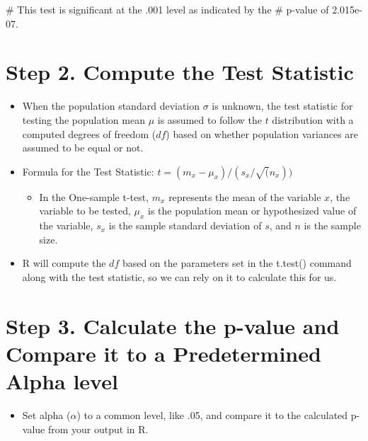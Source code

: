 \documentclass[
  letterpaper,
  DIV=11,
  numbers=noendperiod]{scrreprt}
\newenvironment{Shaded}{\begin{snugshade}}{\end{snugshade}}
\newcommand{\CommentTok}[1]{\textcolor[rgb]{0.37,0.37,0.37}{#1}}
\providecommand{\tightlist}{%
  \setlength{\itemsep}{0pt}\setlength{\parskip}{0pt}}\usepackage{longtable,booktabs,array}
\begin{document}
\begin{Shaded}
\begin{Highlighting}[]
\CommentTok{\# This test is significant at the .001 level as indicated by the}
\CommentTok{\# p{-}value of 2.015e{-}07.}
\end{Highlighting}
\end{Shaded}

\section{Step 2. Compute the Test
Statistic}\label{step-2.-compute-the-test-statistic}

\begin{itemize}
\tightlist
\item
  When the population standard deviation \(\sigma\) is unknown, the test
  statistic for testing the population mean \(\mu\) is assumed to follow
  the \(t\) distribution with a computed degrees of freedom (\(df\))
  based on whether population variances are assumed to be equal or not.
\item
  Formula for the Test Statistic: \(t = (m_x-\mu_x)/(s_x/\sqrt(n_x))\)

  \begin{itemize}
  \tightlist
  \item
    In the One-sample t-test, \(m_x\) represents the mean of the
    variable \(x\), the variable to be tested, \(\mu_x\) is the
    population mean or hypothesized value of the variable, \(s_x\) is
    the sample standard deviation of \(s\), and \(n\) is the sample
    size.
  \end{itemize}
\item
  R will compute the \(df\) based on the parameters set in the t.test()
  command along with the test statistic, so we can rely on it to
  calculate this for us.
\end{itemize}

\section{Step 3. Calculate the p-value and Compare it to a Predetermined
Alpha
level}\label{step-3.-calculate-the-p-value-and-compare-it-to-a-predetermined-alpha-level}

\begin{itemize}
\tightlist
\item
  Set alpha (\(\alpha\)) to a common level, like .05, and compare it to
  the calculated p-value from your output in R.
\end{itemize}
\end{document}
